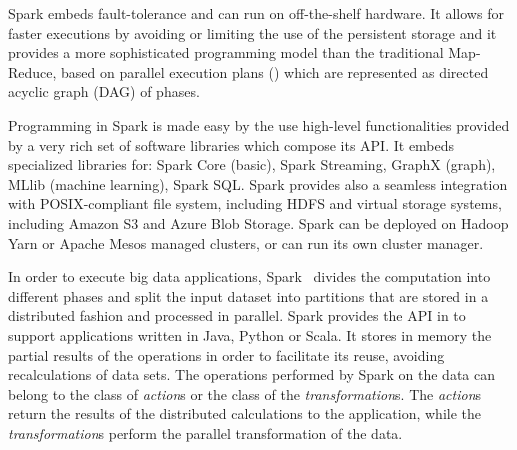 
Spark embeds fault-tolerance and can run on off-the-shelf hardware. It allows for faster executions by avoiding or limiting the use of the persistent storage and it provides a more sophisticated programming model than the traditional Map-Reduce, based on parallel execution plans (\plans) which are represented as directed acyclic graph (DAG) of phases.

Programming in Spark is made easy by the use high-level functionalities provided by a very rich set of software libraries which compose its API. It embeds specialized libraries for: Spark Core (basic), Spark Streaming, GraphX (graph), MLlib (machine learning), Spark SQL. Spark provides also a seamless integration with POSIX-compliant file system, including HDFS and virtual storage systems, including Amazon S3 and Azure Blob Storage. Spark can be deployed on Hadoop Yarn or Apache Mesos managed clusters, or can run its own cluster manager.  
 

In order to execute big data applications, Spark~\cite{Zaharia2010} divides the computation into different phases and split the input dataset into partitions that are stored in a distributed fashion and processed in parallel. Spark provides the API in to support applications written in Java, Python or Scala. It stores in memory the partial results of the operations in order to facilitate its reuse, avoiding recalculations of data sets. 
The operations performed by Spark on the data can belong to the class of \textit{action}s or the class of the \textit{transformation}s. The \textit{action}s return the results of the distributed calculations to the application, while the \textit{transformation}s perform the parallel transformation of the data. 

